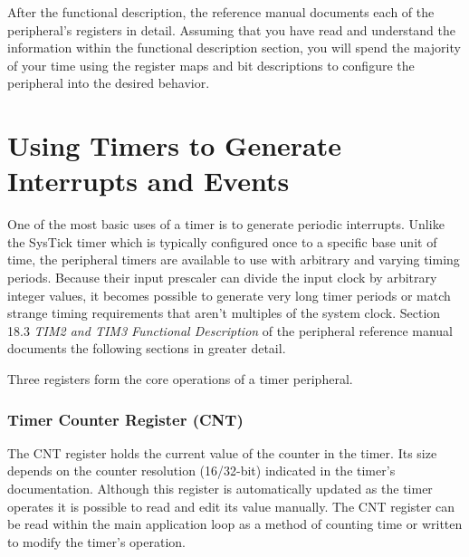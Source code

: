 \documentclass[openany,11pt,fleqn]{book} %
\begin{document}
    After the functional description, the reference manual documents each of the peripheral's registers in detail. Assuming that you have read and understand the information within the functional description section, you will spend the majority of your time using the register maps and bit descriptions to configure the peripheral into the desired behavior. 

%    
%    

\section{Using Timers to Generate Interrupts and Events} \label{timer_interrupts}

    One of the most basic uses of a timer is to generate periodic interrupts. Unlike the SysTick timer which is typically configured once to a specific base unit of time, the peripheral timers are available to use with arbitrary and varying timing periods. Because their input prescaler can divide the input clock by arbitrary integer values, it becomes possible to generate very long timer periods or match strange timing requirements that aren't multiples of the system clock. Section 18.3 \textit{TIM2 and TIM3 Functional Description} of the peripheral reference manual documents the following sections in greater detail. 
    
    Three registers form the core operations of a timer peripheral. 
    \subsubsection{Timer Counter Register (CNT)}
    The CNT register holds the current value of the counter in the timer. Its size depends on the counter resolution (16/32-bit) indicated in the timer's documentation. Although this register is automatically updated as the timer operates it is possible to read and edit its value manually. The CNT register can be read within the main application loop as a method of counting time or written to modify the timer's operation. 
\end{document}

